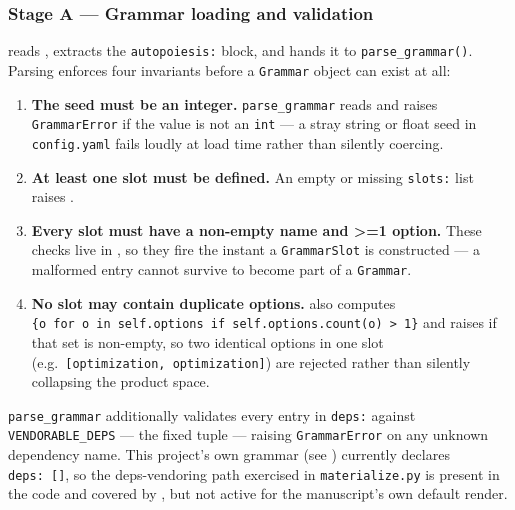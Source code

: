 \documentclass[
]{article}
\providecommand{\tightlist}{%
  \setlength{\itemsep}{0pt}\setlength{\parskip}{0pt}}
\begin{document}
\subsubsection{Stage A --- Grammar loading and
validation}\label{stage-a-grammar-loading-and-validation}

 reads
, extracts the \texttt{autopoiesis:}
block, and hands it to \texttt{parse\_grammar()}. Parsing enforces four
invariants before a \texttt{Grammar} object can exist at all:

\begin{enumerate}
\def\labelenumi{\arabic{enumi}.}
\tightlist
\item
  \textbf{The seed must be an integer.} \texttt{parse\_grammar} reads
   and raises \texttt{GrammarError} if
  the value is not an \texttt{int} --- a stray string or float seed in
  \texttt{config.yaml} fails loudly at load time rather than silently
  coercing.
\item
  \textbf{At least one slot must be defined.} An empty or missing
  \texttt{slots:} list raises
  .
\item
  \textbf{Every slot must have a non-empty name and \texorpdfstring{\textgreater{}=}{>=}1 option.} These
  checks live in , so they fire
  the instant a \texttt{GrammarSlot} is constructed --- a malformed
  entry cannot survive to become part of a \texttt{Grammar}.
\item
  \textbf{No slot may contain duplicate options.}
   also computes
  \texttt{\{o\ for\ o\ in\ self.options\ if\ self.options.count(o)\ \textgreater{}\ 1\}}
  and raises if that set is non-empty, so two identical options in one
  slot (e.g.~\texttt{{[}optimization,\ optimization{]}}) are rejected
  rather than silently collapsing the product space.
\end{enumerate}

\texttt{parse\_grammar} additionally validates every entry in
\texttt{deps:} against \texttt{VENDORABLE\_DEPS} --- the fixed tuple
--- raising \texttt{GrammarError} on any unknown dependency name. This
project's own grammar (see ) currently
declares \texttt{deps:\ {[}{]}}, so the deps-vendoring path exercised in
\texttt{materialize.py} is present in the code and covered by
, but not active for the manuscript's
own default render.
\end{document}
